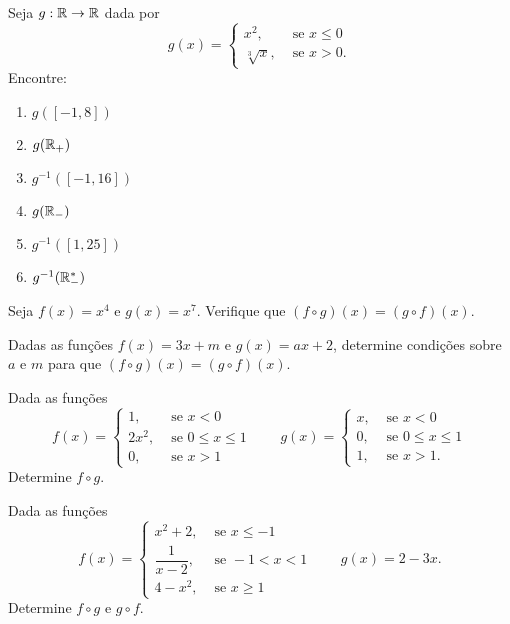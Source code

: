 \documentclass[12pt]{exam}
\begin{document}
\questao Seja $g : \mathbb{R} \to \mathbb{R}$ dada por
\[
	g(x) = \begin{cases}
		x^2,& \mbox{ se } x \le 0\\
		\sqrt[3]{x}, & \mbox{ se } x > 0.
	\end{cases}
\]
Encontre:
\begin{multicols}{2}
	\begin{enumerate}[label={\alph*})]
		\item $g([-1,8])$
		\item $g(\mathbb{R}_+)$
		\item $g^{-1}([-1,16])$
		\item $g(\mathbb{R}_-)$
		\item $g^{-1}([1,25])$
		\item $g^{-1}(\mathbb{R}^*_-)$
	\end{enumerate}	
\end{multicols}


\vspace{.3cm}

\questao Seja $f(x) = x^4$ e $g(x) = x^7$. Verifique que $(f\circ g)(x) = (g\circ f)(x)$.

\vspace{.3cm}

\questao Dadas as funções $f(x) = 3x + m$ e $g(x) = ax + 2$, determine condições sobre $a$ e $m$ para que $(f\circ g)(x) = (g\circ f)(x)$.

\vspace{.3cm}

\questao Dada as funções
\[
	f(x) = \begin{cases}
		1, & \mbox{ se } x < 0\\
		2x^2, & \mbox{ se } 0 \le x \le 1\\
		0, & \mbox{ se } x > 1
	\end{cases} \qquad g(x) = \begin{cases}
		x, & \mbox{ se } x < 0\\
		0, & \mbox{ se } 0 \le x \le 1\\
		1, & \mbox{ se } x > 1.
	\end{cases}
\]
Determine $f\circ g$.

\vspace{.3cm}

\questao Dada as funções
\[
	f(x) = \begin{cases}
		x^2 + 2, & \mbox{ se } x \le -1\\
		\dfrac{1}{x - 2}, & \mbox{ se } -1 < x < 1\\
		4 - x^2, & \mbox{ se } x \ge 1
	\end{cases} \qquad g(x) = 2 - 3x.
\]
Determine $f\circ g$ e $g \circ f$.
\end{document}
